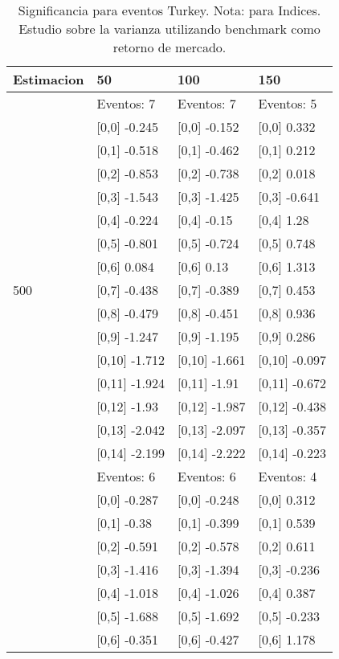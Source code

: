 \begin{table}

\caption{Significancia para eventos Turkey. Nota: para Indices. Estudio sobre la varianza utilizando benchmark como retorno de mercado.}
\centering
\begin{tabular}[t]{llll}
\toprule
Estimacion & 50 & 100 & 150\\
\midrule
 & Eventos:  7 & Eventos:  7 & Eventos:  5\\
 & {}[0,0] -0.245 & {}[0,0] -0.152 & {}[0,0] 0.332\\
 & {}[0,1] -0.518 & {}[0,1] -0.462 & {}[0,1] 0.212\\
 & {}[0,2] -0.853 & {}[0,2] -0.738 & {}[0,2] 0.018\\
 & {}[0,3] -1.543 & {}[0,3] -1.425 & {}[0,3] -0.641\\
\addlinespace
 & {}[0,4] -0.224 & {}[0,4] -0.15 & {}[0,4] 1.28\\
 & {}[0,5] -0.801 & {}[0,5] -0.724 & {}[0,5] 0.748\\
 & {}[0,6] 0.084 & {}[0,6] 0.13 & {}[0,6] 1.313\\
500 & {}[0,7] -0.438 & {}[0,7] -0.389 & {}[0,7] 0.453\\
 & {}[0,8] -0.479 & {}[0,8] -0.451 & {}[0,8] 0.936\\
\addlinespace
 & {}[0,9] -1.247 & {}[0,9] -1.195 & {}[0,9] 0.286\\
 & {}[0,10] -1.712 & {}[0,10] -1.661 & {}[0,10] -0.097\\
 & {}[0,11] -1.924 & {}[0,11] -1.91 & {}[0,11] -0.672\\
 & {}[0,12] -1.93 & {}[0,12] -1.987 & {}[0,12] -0.438\\
 & {}[0,13] -2.042 & {}[0,13] -2.097 & {}[0,13] -0.357\\
\addlinespace
 & {}[0,14] -2.199 & {}[0,14] -2.222 & {}[0,14] -0.223\\
 & Eventos:  6 & Eventos:  6 & Eventos:  4\\
 & {}[0,0] -0.287 & {}[0,0] -0.248 & {}[0,0] 0.312\\
 & {}[0,1] -0.38 & {}[0,1] -0.399 & {}[0,1] 0.539\\
 & {}[0,2] -0.591 & {}[0,2] -0.578 & {}[0,2] 0.611\\
\addlinespace
 & {}[0,3] -1.416 & {}[0,3] -1.394 & {}[0,3] -0.236\\
 & {}[0,4] -1.018 & {}[0,4] -1.026 & {}[0,4] 0.387\\
 & {}[0,5] -1.688 & {}[0,5] -1.692 & {}[0,5] -0.233\\
 & {}[0,6] -0.351 & {}[0,6] -0.427 & {}[0,6] 1.178\\

\end{tabular}
\end{table}
